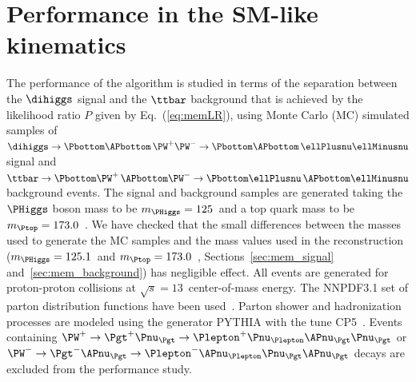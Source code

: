 \section{Performance in the SM-like kinematics}
\label{sec:performance}

The performance of the algorithm is studied in terms of the separation between the $\dihiggs$ signal and the $\ttbar$ background 
that is achieved by the likelihood ratio $P$ given by Eq.~(\ref{eq:memLR}),
using Monte Carlo (MC) simulated samples of 
$\dihiggs \to \Pbottom\APbottom \, \PW^{+}\PW^{-} \to \Pbottom\APbottom \, \ellPlusnu\ellMinusnu$ signal 
and $\ttbar \to \Pbottom\PW^{+} \, \APbottom\PW^{-} \to \Pbottom\ellPlusnu \, \APbottom\ellMinusnu$ background events.
The signal and background samples are generated 
taking the $\PHiggs$ boson mass to be $m_{\PHiggs} = 125$~\GeV and a top quark mass to be $m_{\Ptop} = 173.0$~\GeV. 
We have checked that the small differences between the masses used to generate the MC samples
and the mass values used in the reconstruction ($m_{\PHiggs} = 125.1$~\GeV and $m_{\Ptop} = 173.0$~\GeV, \cf Sections~\ref{sec:mem_signal} and~\ref{sec:mem_background})
has negligible effect.
All events are generated for proton-proton collisions at $\sqrt{s} = 13$~\TeV center-of-mass energy.
The NNPDF3.1 set of parton distribution functions have been used~\cite{NNPDF1,NNPDF2,NNPDF3}.
Parton shower and hadronization processes are modeled using the generator PYTHIA with the tune CP5~\cite{PYTHIA_CP5tune_CMS}.
Events containing $\PW^{+} \to \Pgt^{+}\Pnu_{\Pgt} \to \Plepton^{+}\Pnu_{\Plepton}\APnu_{\Pgt}\Pnu_{\Pgt}$ 
or $\PW^{-} \to \Pgt^{-}\APnu_{\Pgt} \to \Plepton^{-}\APnu_{\Plepton}\Pnu_{\Pgt}\APnu_{\Pgt}$ decays  are excluded from the performance study. 

